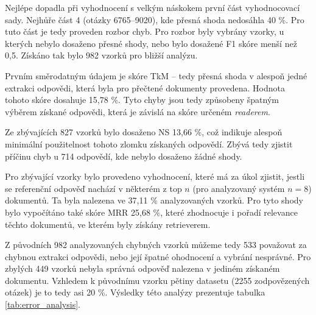 Nejlépe dopadla při vyhodnocení s velkým náskokem první část vyhodnocovací sady. Nejhůře část 4 (otázky 6765--9020), kde přesná shoda nedosáhla 40 \%. Pro tuto část je tedy proveden rozbor chyb. Pro rozbor byly vybrány vzorky, u kterých nebylo dosaženo přesné shody, nebo bylo dosažené F1 skóre menší než 0,5. Získáno tak bylo 982 vzorků pro bližší analýzu.\par
Prvním směrodatným údajem je skóre TkM -- tedy přesná shoda v alespoň jedné extrakci odpovědi, která byla pro přečtené dokumenty provedena. Hodnota tohoto skóre dosahuje 15,78 \%. Tyto chyby jsou tedy způsobeny špatným výběrem získané odpovědi, která je závislá na skóre určeném \emph{readerem}.\par
Ze zbývajících 827 vzorků bylo dosaženo NS 13,66 \%, což indikuje alespoň minimální použitelnost tohoto zlomku získaných odpovědí. Zbývá tedy zjistit příčinu chyb u 714 odpovědí, kde nebylo dosaženo žádné shody.\par
Pro zbývající vzorky bylo provedeno vyhodnocení, které má za úkol zjistit, jestli se referenční odpověď nachází v některém z top $n$ (pro analyzovaný systém $n=8$) dokumentů. Ta byla nalezena ve 37,11 \% analyzovaných vzorků. Pro tyto shody bylo vypočítáno také skóre MRR 25,68 \%, které zhodnocuje i pořadí relevance těchto dokumentů, ve kterém byly získány retrieverem.\par
Z původních 982 analyzovaných chybných vzorků můžeme tedy 533 považovat za chybnou extrakci odpovědi, nebo její špatné ohodnocení a vybrání nesprávné. Pro zbylých 449 vzorků nebyla správná odpověď nalezena v jediném získaném dokumentu. Vzhledem k původnímu vzorku pětiny datasetu (2255 zodpovězených otázek) je to tedy asi 20 \%. Výsledky této analýzy prezentuje tabulka \ref{tab:error_analysis}.

